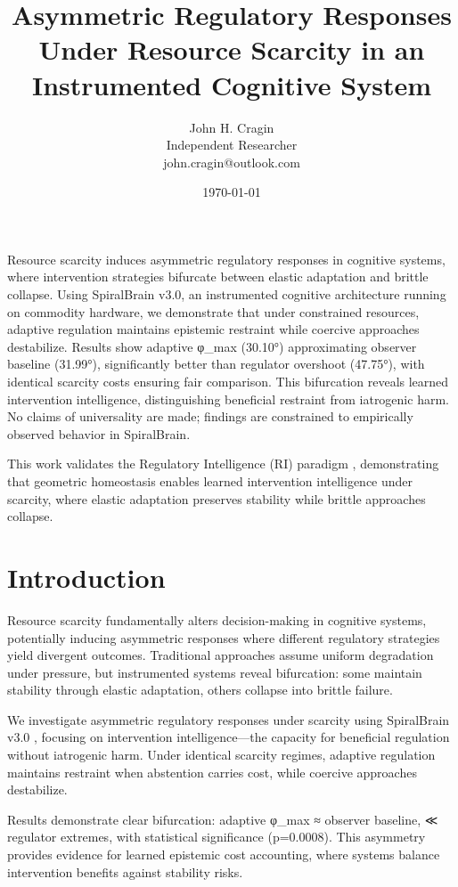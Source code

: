 \documentclass[12pt,a4paper]{report}
\title{Asymmetric Regulatory Responses Under Resource Scarcity in an Instrumented Cognitive System}
\author{John H. Cragin \\
Independent Researcher \\
john.cragin@outlook.com}
\date{\today}
\begin{document}
\maketitle

Resource scarcity induces asymmetric regulatory responses in cognitive systems, where intervention strategies bifurcate between elastic adaptation and brittle collapse. Using SpiralBrain v3.0, an instrumented cognitive architecture running on commodity hardware, we demonstrate that under constrained resources, adaptive regulation maintains epistemic restraint while coercive approaches destabilize. Results show adaptive φ_max (30.10°) approximating observer baseline (31.99°), significantly better than regulator overshoot (47.75°), with identical scarcity costs ensuring fair comparison. This bifurcation reveals learned intervention intelligence, distinguishing beneficial restraint from iatrogenic harm. No claims of universality are made; findings are constrained to empirically observed behavior in SpiralBrain.

This work validates the Regulatory Intelligence (RI) paradigm \cite{Cragin2026Thesis}, demonstrating that geometric homeostasis enables learned intervention intelligence under scarcity, where elastic adaptation preserves stability while brittle approaches collapse.

\section{Introduction}

Resource scarcity fundamentally alters decision-making in cognitive systems, potentially inducing asymmetric responses where different regulatory strategies yield divergent outcomes. Traditional approaches assume uniform degradation under pressure, but instrumented systems reveal bifurcation: some maintain stability through elastic adaptation, others collapse into brittle failure.

We investigate asymmetric regulatory responses under scarcity using SpiralBrain v3.0 \cite{SpiralBrainRepo}, focusing on intervention intelligence—the capacity for beneficial regulation without iatrogenic harm. Under identical scarcity regimes, adaptive regulation maintains restraint when abstention carries cost, while coercive approaches destabilize.

Results demonstrate clear bifurcation: adaptive φ_max ≈ observer baseline, ≪ regulator extremes, with statistical significance (p=0.0008). This asymmetry provides evidence for learned epistemic cost accounting, where systems balance intervention benefits against stability risks.
\end{document}
